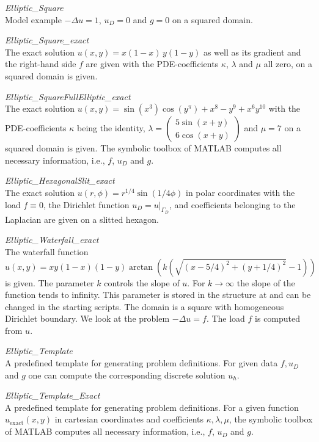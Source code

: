 \noindent\emph{Elliptic\_Square}\smallskip\\
Model example $-\Delta u = 1$, $u_D=0$ and $g=0$ on a squared domain.
\bigskip

\noindent\emph{Elliptic\_Square\_exact}\smallskip\\
The exact solution $u(x,y) = x(1-x)\,y(1-y)$ as well as its gradient and the right-hand side $f$ are given with the PDE-coefficients $\kappa$, $\lambda$ and $\mu$ all zero, on a squared domain is given.
\bigskip

\noindent\emph{Elliptic\_SquareFullElliptic\_exact}\smallskip\\
The exact solution $u(x,y) = \sin(x^3)\cos(y^\pi)+x^8-y^9+x^6 y^{10}$ with the PDE-coefficients $\kappa$ being the identity, $\lambda = \left( \begin{smallmatrix} 5\sin(x+y)\\ 6\cos(x+y) \end{smallmatrix}\right)$ and $\mu=7$ on a squared domain is given. The symbolic toolbox of MATLAB computes all necessary information, i.e., $f$, $u_D$ and $g$.
\bigskip

\noindent\emph{Elliptic\_HexagonalSlit\_exact}\smallskip\\
The exact solution $u(r,\phi)=r^{1/4}\sin(1/4\phi)$ in polar coordinates with the load $f\equiv0$, the Dirichlet function $u_D=u|_{\Gamma_D}$, and coefficients belonging to the Laplacian are given on a slitted hexagon.
\bigskip

\noindent\emph{Elliptic\_Waterfall\_exact}\smallskip\\
The waterfall function $$u(x,y) = xy(1-x)(1-y) \arctan\left(k(\sqrt{(x-5/4)^2 + (y+1/4)^2}-1)\right)$$ is given. The parameter $k$ controls the slope of $u$. For $k\rightarrow\infty$ the slope of the function tends to infinity. This parameter is stored in the structure  at  and can be changed in the starting scripts. The domain is a square with homogeneous Dirichlet boundary. We look at the problem $-\Delta u = f$. The load $f$ is computed from $u$.
\bigskip

\noindent\emph{Elliptic\_Template}\smallskip\\
A predefined template for generating problem definitions. For given data $f, u_D$ and $g$ one can compute the corresponding discrete solution $u_h$.
\bigskip

\noindent\emph{Elliptic\_Template\_Exact}\smallskip\\
A predefined template for generating problem definitions. For a given function $u_{\text{exact}}(x,y)$ in cartesian coordinates and coefficients $\kappa,\lambda,\mu$, the symbolic toolbox of MATLAB computes all necessary information, i.e., $f$, $u_D$ and $g$.
\bigskip


